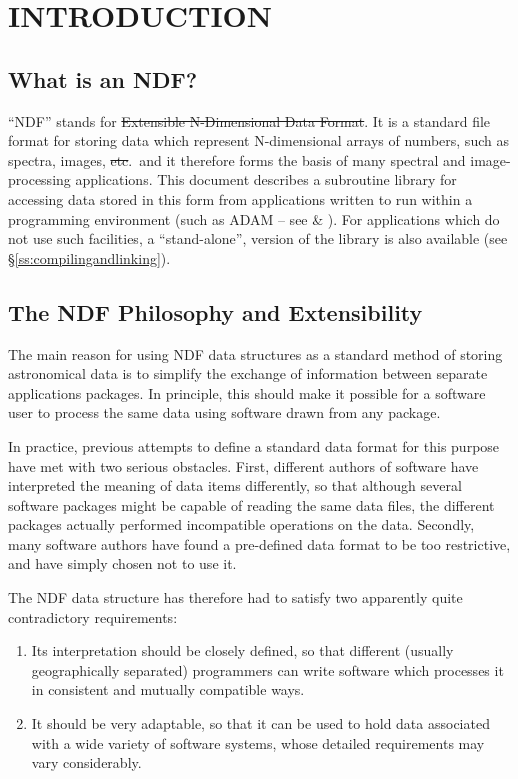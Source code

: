 \section{INTRODUCTION}

\subsection{What is an NDF?}

``NDF'' stands for \st{Extensible N-Dimensional Data Format}.  It is
a standard file format for storing data which represent N-dimensional
arrays of numbers, such as spectra, images, \st{etc}.\ and it
therefore forms the basis of many spectral and image-processing
applications.
This document describes a subroutine library for accessing data stored
in this form from applications written to run within a programming
environment (such as ADAM -- see  \&
).
For applications which do not use such facilities, a ``stand-alone'',
version of the library is also available (see
\S\ref{ss:compilingandlinking}).

\subsection{The NDF Philosophy and Extensibility}

The main reason for using NDF data structures as a standard method of
storing astronomical data is to simplify the exchange of information
between separate applications packages.  In principle, this should
make it possible for a software user to process the same data using
software drawn from any package.

In practice, previous attempts to define a standard data format for this
purpose have met with two serious obstacles. 
First, different authors of software have interpreted the meaning of data
items differently, so that although several software packages might be
capable of reading the same data files, the different packages actually
performed incompatible operations on the data. 
Secondly, many software authors have found a pre-defined data format to be
too restrictive, and have simply chosen not to use it. 

The NDF data structure has therefore had to satisfy two apparently quite
contradictory requirements: 

\begin{enumerate}

\item Its interpretation should be closely defined, so that different
(usually geographically separated) programmers can write software which
processes it in consistent and mutually compatible ways. 

\item It should be very adaptable, so that it can be used to hold data
associated with a wide variety of software systems, whose detailed
requirements may vary considerably. 

\end{enumerate}

